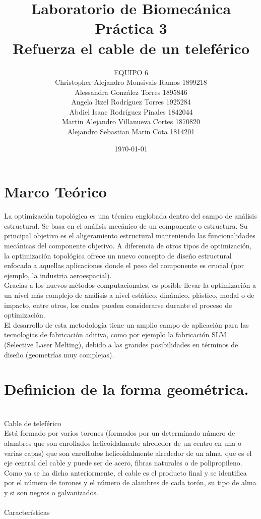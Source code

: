 \documentclass{article}
\author{EQUIPO 6\\Christopher Alejandro Monsivais Ramos   1899218\\
Alessandra González Torres  1895846\\
Angela Itzel Rodríguez Torres   1925284\\
Abdiel Isaac Rodríguez Pinales  1842044\\
Martin Alejandro Villanueva Cortes  1870820\\
Alejandro Sebastian Marin Cota  1814201} %
\title{Laboratorio de Biomecánica\\Pr\'{a}ctica 3\\Refuerza el cable de un telef\'{e}rico} %
\date{\today}
\begin{document}

\maketitle %

\section{Marco Te\'{o}rico}\label{intro} %
La optimización topológica es una técnica englobada dentro del campo de análisis estructural. Se basa en el análisis mecánico de un componente o estructura. Su principal objetivo es el aligeramiento estructural manteniendo las funcionalidades mecánicas del componente objetivo. A diferencia de otros tipos de optimización, la optimización topológica ofrece un nuevo concepto de diseño estructural enfocado a aquellas aplicaciones donde el peso del componente es crucial (por ejemplo, la industria aeroespacial).
\\
Gracias a los nuevos métodos computacionales, es posible llevar la optimización a un nivel más complejo de análisis a nivel estático, dinámico, plástico, modal o de impacto, entre otros, los cuales pueden considerarse durante el proceso de optimización.
\\
El desarrollo de esta metodología tiene un amplio campo de aplicación para las tecnologías de fabricación aditiva, como por ejemplo la fabricación SLM (Selective Laser Melting), debido a las grandes posibilidades en términos de diseño (geometrías muy complejas).\cite{ff2}

\section{Definicion de la forma geométrica.}\label{intro} %
\\
Cable de teleférico 
\\
Está formado por varios torones (formados por un determinado número de
alambres que son enrollados helicoidalmente alrededor de un centro en una o varias capas) que son enrollados helicoidalmente alrededor de un alma, que es el eje central del cable y puede ser de acero, fibras naturales o de polipropileno.
\\
Como ya se ha dicho anteriormente, el cable es el producto final y se identifica por el número de torones y el número de alambres de cada torón, su tipo de alma y si son negros o galvanizados.
\\
\\
Características
\end{document}
